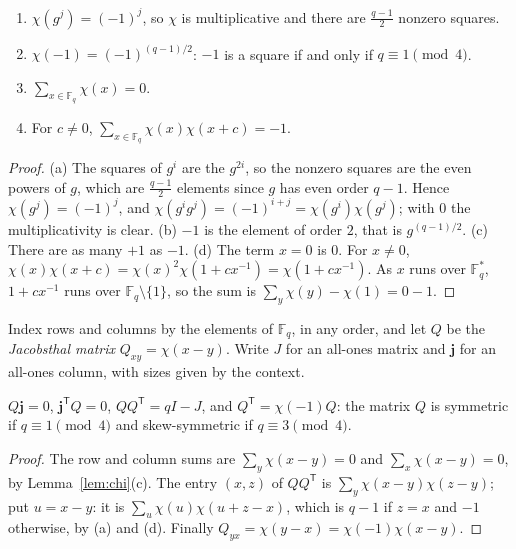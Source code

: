 \begin{lemma}\label{lem:chi}
\begin{enumerate}
\item $\chi(g^j)=(-1)^j$, so $\chi$ is multiplicative and there are $\frac{q-1}2$ nonzero squares.
\item $\chi(-1)=(-1)^{(q-1)/2}$: $-1$ is a square if and only if $q\equiv1\pmod4$.
\item $\sum_{x\in\mathbb F_q}\chi(x)=0$.
\item For $c\neq0$, $\sum_{x\in\mathbb F_q}\chi(x)\chi(x+c)=-1$.
\end{enumerate}
\end{lemma}
\begin{proof}
(a) The squares of $g^i$ are the $g^{2i}$, so the nonzero squares are the even powers of $g$, which are $\frac{q-1}2$ elements since $g$ has even order
$q-1$. Hence $\chi(g^j)=(-1)^j$, and $\chi(g^ig^j)=(-1)^{i+j}=\chi(g^i)\chi(g^j)$; with $0$ the multiplicativity is clear. (b) $-1$ is the element of
order $2$, that is $g^{(q-1)/2}$. (c) There are as many $+1$ as $-1$. (d) The term $x=0$ is $0$. For $x\neq0$,
$\chi(x)\chi(x+c)=\chi(x)^2\chi(1+cx^{-1})=\chi(1+cx^{-1})$. As $x$ runs over $\mathbb F_q^*$, $1+cx^{-1}$ runs over $\mathbb F_q\setminus\{1\}$, so the sum is
$\sum_y\chi(y)-\chi(1)=0-1$.
\end{proof}

Index rows and columns by the elements of $\mathbb F_q$, in any order, and let $Q$ be the \emph{Jacobsthal matrix} $Q_{xy}=\chi(x-y)$. Write $J$ for an
all-ones matrix and $\mathbf j$ for an all-ones column, with sizes given by the context.

\begin{lemma}\label{lem:jacobsthal}
$Q\mathbf j=0$, $\mathbf j^{\mathsf T}Q=0$, $QQ^{\mathsf T}=qI-J$, and $Q^{\mathsf T}=\chi(-1)Q$: the matrix $Q$ is symmetric if $q\equiv1\pmod4$ and
skew-symmetric if $q\equiv3\pmod4$.
\end{lemma}
\begin{proof}
The row and column sums are $\sum_y\chi(x-y)=0$ and $\sum_x\chi(x-y)=0$, by Lemma~\ref{lem:chi}(c). The entry $(x,z)$ of $QQ^{\mathsf T}$ is
$\sum_y\chi(x-y)\chi(z-y)$; put $u=x-y$: it is $\sum_u\chi(u)\chi(u+z-x)$, which is $q-1$ if $z=x$ and $-1$ otherwise, by (a) and (d). Finally
$Q_{yx}=\chi(y-x)=\chi(-1)\chi(x-y)$.
\end{proof}

